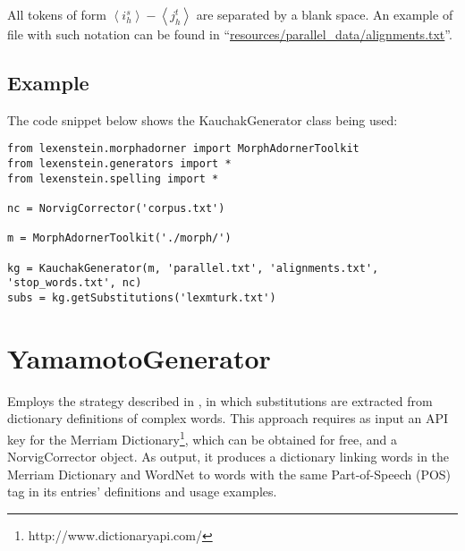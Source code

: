All tokens of form $\left \langle i_{h}^{s} \right \rangle\! -\! \left \langle j_{h}^{t} \right \rangle$ are separated by a blank space. An example of file with such notation can be found in ``\url{resources/parallel_data/alignments.txt}''.

\subsection{Example}

The code snippet below shows the KauchakGenerator class being used:

\begin{lstlisting}
from lexenstein.morphadorner import MorphAdornerToolkit
from lexenstein.generators import *
from lexenstein.spelling import *

nc = NorvigCorrector('corpus.txt')

m = MorphAdornerToolkit('./morph/')

kg = KauchakGenerator(m, 'parallel.txt', 'alignments.txt', 'stop_words.txt', nc)
subs = kg.getSubstitutions('lexmturk.txt')
\end{lstlisting}

































\section{YamamotoGenerator}

Employs the strategy described in \cite{Yamamoto2013}, in which substitutions are extracted from dictionary definitions of complex words. This approach requires as input an API key for the Merriam Dictionary\footnote{http://www.dictionaryapi.com/}, which can be obtained for free, and a NorvigCorrector object. As output, it produces a dictionary linking words in the Merriam Dictionary and WordNet to words with the same Part-of-Speech (POS) tag in its entries' definitions and usage examples.

